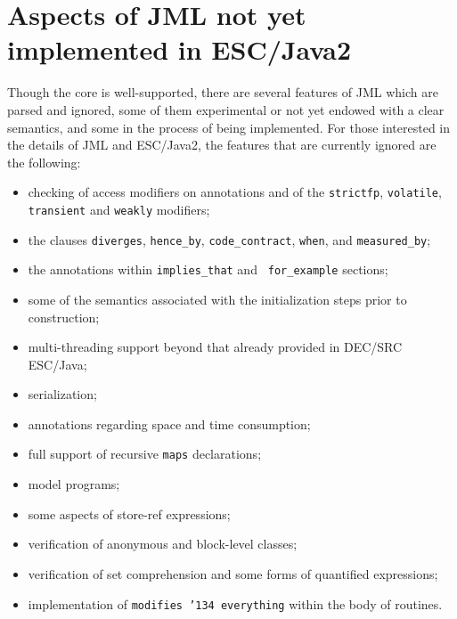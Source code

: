 \documentclass{llncs}
\begin{document}
\section{Aspects of JML not yet\\implemented in ESC/Java2}

Though the core is well-supported, there are several features of JML
which are parsed and ignored, some of them experimental or not yet
endowed with a clear semantics, and some in the process of being
implemented.  For those interested in the details of JML and
ESC/Java2, the features that are currently ignored are the following:
\setlength{\partopsep}{0in}\setlength{\parskip}{0in}\setlength{\itemsep}{0in}\setlength{\topsep}{0in}
\begin{itemize}
\setlength{\partopsep}{0in}\setlength{\parskip}{0in}\setlength{\itemsep}{0in}\setlength{\topsep}{0in}
\item checking of access modifiers on annotations and of the
 \texttt{strictfp}, \texttt{volatile},
  \texttt{transient} and \texttt{weakly} modifiers;
\item the clauses \texttt{diverges}, \texttt{hence\_by},
  \texttt{code\_contract}, \texttt{when}, and \texttt{measured\_by};
\item the annotations within \texttt{implies\_that} and {\tt
    for\_example} sections;
\item some of the semantics associated with the initialization steps prior to
  construction;
\item multi-threading support beyond that already provided in DEC/SRC ESC/\-Java;
\item serialization;
\item annotations regarding space and time consumption;
\item full support of recursive \texttt{maps} declarations;
\item model programs;
\item some aspects of store-ref expressions;
\item verification of anonymous and block-level classes;
\item verification of set comprehension and some forms of quantified
  expressions;
\item implementation of \texttt{modifies \char'134 everything} within
  the body of routines.
\end{itemize}


\end{document}
